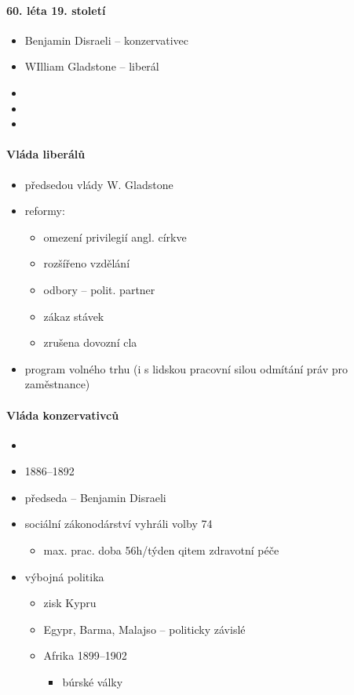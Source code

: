 \paragraph{60. léta 19. století}
\begin{itemize}
\item Benjamin Disraeli -- konzervativec
\item WIlliam Gladstone -- liberál
\item {}
\item 
\item
\end{itemize}

\paragraph{Vláda liberálů}
\begin{itemize}
\item předsedou vlády W. Gladstone
\item reformy: 
	\begin{itemize}
	\item omezení privilegií angl. církve
	\item rozšířeno vzdělání
	\item odbory -- polit. partner
	\item zákaz stávek
	\item zrušena dovozní cla
	\end{itemize}
\item program volného trhu (i s lidskou pracovní silou \ra odmítání práv pro zaměstnance)
\end{itemize}

\paragraph{Vláda konzervativců}
\begin{itemize}
\item {}
\item 1886--1892
\item předseda -- Benjamin Disraeli
\item sociální zákonodárství \ra vyhráli volby 74
	\begin{itemize}
	\item max. prac. doba 56h/týden
	qitem zdravotní péče
	\end{itemize}
\item výbojná politika
	\begin{itemize}
	\item zisk Kypru
	\item Egypr, Barma, Malajso -- politicky závislé
	\item Afrika 1899--1902
		\begin{itemize}
		\item búrské války
		\end{itemize}
	\end{itemize}
\end{itemize}

